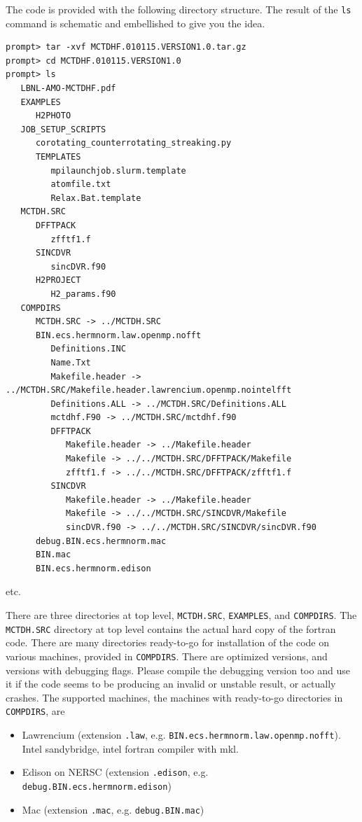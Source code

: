 \documentclass[10pt,leqno, oneside]{book}
\begin{document}
The code is provided with the following directory structure.  The result of the \verb#ls# command is schematic and embellished to give you the idea.
%
{\footnotesize
\begin{verbatim}
prompt> tar -xvf MCTDHF.010115.VERSION1.0.tar.gz
prompt> cd MCTDHF.010115.VERSION1.0
prompt> ls
   LBNL-AMO-MCTDHF.pdf
   EXAMPLES
      H2PHOTO
   JOB_SETUP_SCRIPTS
      corotating_counterrotating_streaking.py
      TEMPLATES
         mpilaunchjob.slurm.template
         atomfile.txt
         Relax.Bat.template
   MCTDH.SRC
      DFFTPACK
         zfftf1.f
      SINCDVR
         sincDVR.f90
      H2PROJECT
         H2_params.f90
   COMPDIRS
      MCTDH.SRC -> ../MCTDH.SRC
      BIN.ecs.hermnorm.law.openmp.nofft
         Definitions.INC
         Name.Txt
         Makefile.header -> ../MCTDH.SRC/Makefile.header.lawrencium.openmp.nointelfft
         Definitions.ALL -> ../MCTDH.SRC/Definitions.ALL
         mctdhf.F90 -> ../MCTDH.SRC/mctdhf.f90
         DFFTPACK
            Makefile.header -> ../Makefile.header
            Makefile -> ../../MCTDH.SRC/DFFTPACK/Makefile
            zfftf1.f -> ../../MCTDH.SRC/DFFTPACK/zfftf1.f
         SINCDVR
            Makefile.header -> ../Makefile.header
            Makefile -> ../../MCTDH.SRC/SINCDVR/Makefile
            sincDVR.f90 -> ../../MCTDH.SRC/SINCDVR/sincDVR.f90
      debug.BIN.ecs.hermnorm.mac
      BIN.mac
      BIN.ecs.hermnorm.edison
\end{verbatim}}
%
etc.

There are three directories at top level, \verb#MCTDH.SRC#, \verb#EXAMPLES#, and \verb#COMPDIRS#.  
The \verb#MCTDH.SRC# directory at top level contains the actual hard copy of the fortran code.
There are many directories ready-to-go for installation of the code on various machines, provided in \verb#COMPDIRS#.  
There are optimized versions, and versions with debugging flags.  Please compile the debugging version too and use it if the code
seems to be producing an invalid or unstable result, or actually crashes.  The supported machines, the machines with ready-to-go
directories in \verb#COMPDIRS#, are 
\begin{itemize}
\item{Lawrencium (extension \verb#.law#, e.g. \verb#BIN.ecs.hermnorm.law.openmp.nofft#).  Intel sandybridge, intel fortran compiler with mkl.}
\item{Edison on NERSC (extension \verb#.edison#, e.g. \verb#debug.BIN.ecs.hermnorm.edison#)}
\item{Mac (extension \verb#.mac#, e.g. \verb#debug.BIN.mac#)}
\end{itemize}
\end{document}

